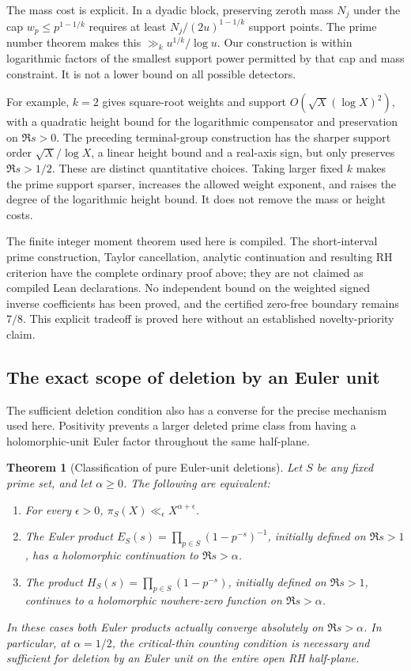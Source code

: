 \documentclass[11pt]{article}
\newtheorem{theorem}{Theorem}[section]
\theoremstyle{definition}
\begin{document}
The mass cost is explicit. In a dyadic block, preserving
zeroth mass $N_j$ under the cap $w_p\le p^{1-1/k}$ requires
at least $N_j/(2u)^{1-1/k}$ support points.
The prime number theorem makes this
$\gg_k u^{1/k}/\log u$. Our construction is within
logarithmic factors of the smallest support power permitted
by that cap and mass constraint.
It is not a lower bound on all possible detectors.

For example, $k=2$ gives square-root weights and support
$O(\sqrt X(\log X)^2)$, with a quadratic height bound for
the logarithmic compensator and preservation on $\Re s>0$.
The preceding terminal-group construction has the sharper
support order $\sqrt X/\log X$, a linear height bound and
a real-axis sign, but only preserves $\Re s>1/2$.
These are distinct quantitative choices.
Taking larger fixed $k$ makes the prime support sparser,
increases the allowed weight exponent, and raises the degree
of the logarithmic height bound. It does not remove the
mass or height costs.

The finite integer moment theorem used here is compiled.
The short-interval prime construction, Taylor cancellation,
analytic continuation and resulting RH criterion have the
complete ordinary proof above; they are not claimed as
compiled Lean declarations. No independent bound on the
weighted signed inverse coefficients has been proved, and
the certified zero-free boundary remains $7/8$.
This explicit tradeoff is proved here without an established
novelty-priority claim.

\subsection{The exact scope of deletion by an Euler unit}
\label{sec:euler-unit-deletion-classification}

The sufficient deletion condition also has a converse for
the precise mechanism used here. Positivity prevents a
larger deleted prime class from having a holomorphic-unit
Euler factor throughout the same half-plane.

\begin{theorem}[Classification of pure Euler-unit deletions]
\label{thm:euler-unit-deletion-classification}
Let $S$ be any fixed prime set, and let $\alpha\ge0$.
The following are equivalent:
\begin{enumerate}
\item For every $\epsilon>0$,
$\pi_S(X)\ll_\epsilon X^{\alpha+\epsilon}$.
\item The Euler product
$E_S(s)=\prod_{p\in S}(1-p^{-s})^{-1}$, initially defined
on $\Re s>1$, has a holomorphic continuation to
$\Re s>\alpha$.
\item The product
$H_S(s)=\prod_{p\in S}(1-p^{-s})$, initially defined
on $\Re s>1$, continues to a holomorphic nowhere-zero
function on $\Re s>\alpha$.
\end{enumerate}
In these cases both Euler products actually converge
absolutely on $\Re s>\alpha$.
In particular, at $\alpha=1/2$, the critical-thin counting
condition is necessary and sufficient for deletion by an
Euler unit on the entire open RH half-plane.
\end{theorem}
\end{document}
